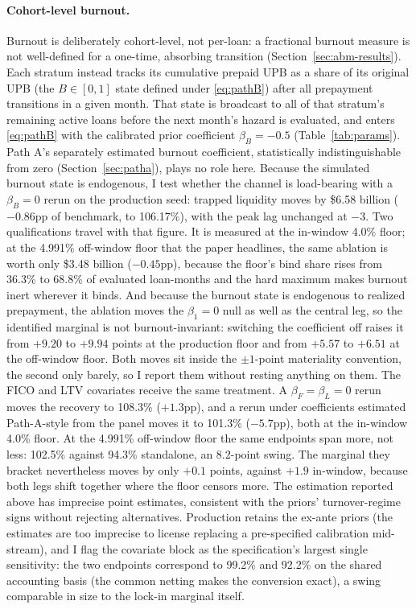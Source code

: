 \documentclass[12pt]{article}
\begin{document}
\paragraph{Cohort-level burnout.}
Burnout is deliberately cohort-level, not per-loan: a fractional burnout measure is not well-defined for a one-time, absorbing transition (Section~\ref{sec:abm-results}). Each stratum instead tracks its cumulative prepaid UPB as a share of its original UPB (the $B \in [0,1]$ state defined under \eqref{eq:pathB}) after all prepayment transitions in a given month. That state is broadcast to all of that stratum's remaining active loans before the next month's hazard is evaluated, and enters \eqref{eq:pathB} with the calibrated prior coefficient $\beta_B = -0.5$ (Table~\ref{tab:params}). Path A's separately estimated burnout coefficient, statistically indistinguishable from zero (Section~\ref{sec:patha}), plays no role here. Because the simulated burnout state is endogenous, I test whether the channel is load-bearing with a $\beta_B = 0$ rerun on the production seed: trapped liquidity moves by \$6.58 billion ($-0.86$pp of benchmark, to 106.17\%), with the peak lag unchanged at $-3$. Two qualifications travel with that figure. It is measured at the in-window 4.0\% floor; at the 4.991\% off-window floor that the paper headlines, the same ablation is worth only \$3.48 billion ($-0.45$pp), because the floor's bind share rises from 36.3\% to 68.8\% of evaluated loan-months and the hard maximum makes burnout inert wherever it binds. And because the burnout state is endogenous to realized prepayment, the ablation moves the $\beta_1 = 0$ null as well as the central leg, so the identified marginal is not burnout-invariant: switching the coefficient off raises it from $+9.20$ to $+9.94$ points at the production floor and from $+5.57$ to $+6.51$ at the off-window floor. Both moves sit inside the $\pm 1$-point materiality convention, the second only barely, so I report them without resting anything on them. The FICO and LTV covariates receive the same treatment. A $\beta_F = \beta_L = 0$ rerun moves the recovery to 108.3\% ($+1.3$pp), and a rerun under coefficients estimated Path-A-style from the panel moves it to 101.3\% ($-5.7$pp), both at the in-window 4.0\% floor. At the 4.991\% off-window floor the same endpoints span more, not less: 102.5\% against 94.3\% standalone, an 8.2-point swing. The marginal they bracket nevertheless moves by only $+0.1$ points, against $+1.9$ in-window, because both legs shift together where the floor censors more. The estimation reported above has imprecise point estimates, consistent with the priors' turnover-regime signs without rejecting alternatives. Production retains the ex-ante priors (the estimates are too imprecise to license replacing a pre-specified calibration mid-stream), and I flag the covariate block as the specification's largest single sensitivity: the two endpoints correspond to 99.2\% and 92.2\% on the shared accounting basis (the common netting makes the conversion exact), a swing comparable in size to the lock-in marginal itself.
\end{document}
